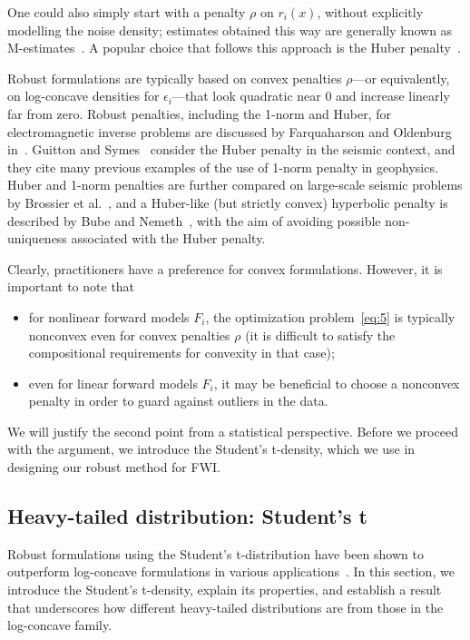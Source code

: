 \documentclass[nospthms]{svjour3}
\numberwithin{equation}{section}
\begin{document}
One could also simply start with a penalty $\rho$ on $r_i(x)$, without
explicitly modelling the noise density; estimates obtained this way
are generally known as M-estimates~\cite{Huber:1981}.  A popular
choice that follows this approach is the Huber
penalty~\cite{Huber:1981,HubRon,Mar}.

Robust formulations are typically based on convex penalties $\rho$---or
equivalently, on log-concave densities for $\epsilon_i$---that look quadratic near $0$ and increase linearly far from zero.
Robust penalties, including the 1-norm and Huber, for electromagnetic
inverse problems are discussed by Farquaharson and Oldenburg
in~\cite{GJI:GJI555}.  Guitton and Symes~\cite{Symes2003} consider the
Huber penalty in the seismic context, and they cite many previous
examples of the use of 1-norm penalty in geophysics. Huber and 1-norm
penalties are further compared on large-scale seismic problems by
Brossier et al.~\cite{Brossier2010}, and a Huber-like (but strictly
convex) hyperbolic penalty is described by Bube and
Nemeth~\cite{Bube2007}, with the aim of avoiding possible
non-uniqueness associated with the Huber penalty.

Clearly, practitioners have a preference for convex formulations.
However, it is important to note that
\begin{itemize}
\item for nonlinear forward models $F_i$, the optimization
  problem~\eqref{eq:5} is typically nonconvex even for convex
  penalties $\rho$ (it is difficult to satisfy the compositional
  requirements for convexity in that case);
\item even for linear forward models $F_i$, it may be beneficial to
  choose a nonconvex penalty in order to guard against
  outliers in the data.
\end{itemize}
We will justify the second point from a statistical
perspective. Before we proceed with the argument, we introduce the
Student's t-density, which we use in designing our robust method for
FWI.






\subsection{Heavy-tailed distribution: Student's t}
Robust formulations using the Student's t-distribution have been shown
to outperform log-concave formulations in various
applications~\cite{AravkinThesis2010}.  In this section, we introduce
the Student's t-density, explain its properties, and establish a
result that underscores how different heavy-tailed distributions are
from those in the log-concave family.
\end{document}

